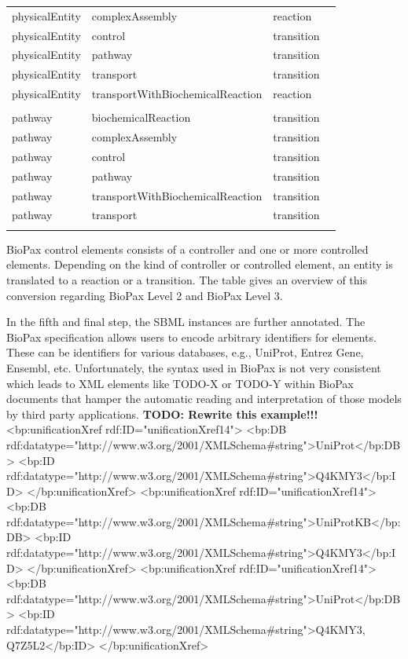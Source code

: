 \documentclass{bioinfo}
\begin{document}
\begin{methods}
\begin{table}[t!h]
{\begin{tabular}{llll}
physicalEntity & complexAssembly                    & reaction\\
physicalEntity & control                            & transition\\
physicalEntity & pathway                            & transition\\
physicalEntity & transport                          & transition\\
physicalEntity & transportWithBiochemicalReaction   & reaction\\
\\
pathway         & biochemicalReaction               & transition\\
pathway         & complexAssembly                   & transition\\
pathway         & control                           & transition\\
pathway         & pathway                           & transition\\
pathway         & transportWithBiochemicalReaction  & transition\\
pathway         & transport                         & transition\\\botrule
\end{tabular}}{BioPax control elements consists of a controller and one or more controlled elements.
Depending on the kind of controller or controlled element, an entity is translated to a reaction or a transition.
The table gives an overview of this conversion regarding BioPax Level 2 and BioPax Level 3.}
\end{table}

In the fifth and final step, the SBML instances are further annotated.
The BioPax specification allows users to encode arbitrary identifiers for elements.
These can be identifiers for various databases, e.g., UniProt, Entrez Gene, Ensembl, etc. Unfortunately, the syntax used in BioPax is not very consistent which leads to XML elements like TODO-X or TODO-Y within BioPax documents that hamper the automatic reading and interpretation of those models by third party applications.
\textbf{TODO: Rewrite this example!!!}
  <bp:unificationXref rdf:ID="unificationXref14">
    <bp:DB rdf:datatype="http://www.w3.org/2001/XMLSchema\#string">UniProt</bp:DB>
    <bp:ID rdf:datatype="http://www.w3.org/2001/XMLSchema\#string">Q4KMY3</bp:ID>
  </bp:unificationXref>
  <bp:unificationXref rdf:ID="unificationXref14">
    <bp:DB rdf:datatype="http://www.w3.org/2001/XMLSchema\#string">UniProtKB</bp:DB>
    <bp:ID rdf:datatype="http://www.w3.org/2001/XMLSchema\#string">Q4KMY3</bp:ID>
  </bp:unificationXref>
  <bp:unificationXref rdf:ID="unificationXref14">
    <bp:DB rdf:datatype="http://www.w3.org/2001/XMLSchema\#string">UniProt</bp:DB>
    <bp:ID rdf:datatype="http://www.w3.org/2001/XMLSchema\#string">Q4KMY3, Q7Z5L2</bp:ID>
  </bp:unificationXref>
  

\end{methods}
\end{document}
